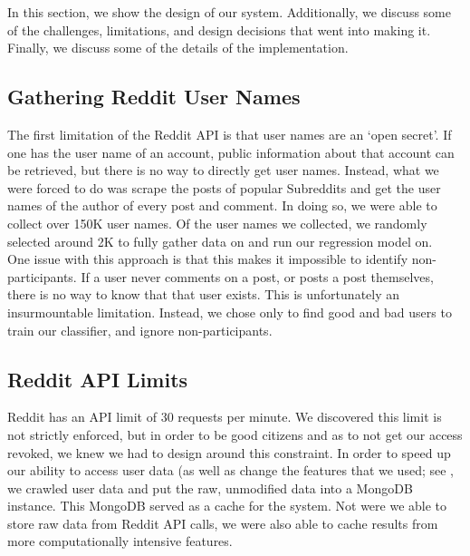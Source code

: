 In this section, we show the design of our system. Additionally, we discuss some
of the challenges, limitations, and design decisions that went into making it.
Finally, we discuss some of the details of the implementation.

\subsection{Gathering Reddit User Names} %
\label{sub:gathering_reddit_user_names}

The first limitation of the Reddit API is that user names are an `open secret'.
If one has the user name of an account, public information about that account
can be retrieved, but there is no way to directly get user names. Instead, what
we were forced to do was scrape the posts of popular Subreddits and get the user
names of the author of every post and comment. In doing so, we were able to
collect over 150K user names. Of the user names we collected, we randomly
selected around 2K to fully gather data on and run our regression model on.
\\
One issue with this approach is that this makes it impossible to identify non-
participants. If a user never comments on a post, or posts a post themselves,
there is no way to know that that user exists. This is unfortunately an
insurmountable limitation. Instead, we chose only to find good and bad users to
train our classifier, and ignore non-participants.


\subsection{Reddit API Limits} %
\label{sub:reddit_api_limits}

Reddit has an API limit of 30 requests per minute. We discovered this limit is
not strictly enforced, but in order to be good citizens and as to not get our
access revoked, we knew we had to design around this constraint. In order to
speed up our ability to access user data (as well as change the features that we
used; see , we crawled user data and put the
raw, unmodified data into a MongoDB instance. This MongoDB served as a cache for
the system. Not were we able to store raw data from Reddit API calls, we were
also able to cache results from more computationally intensive features.


